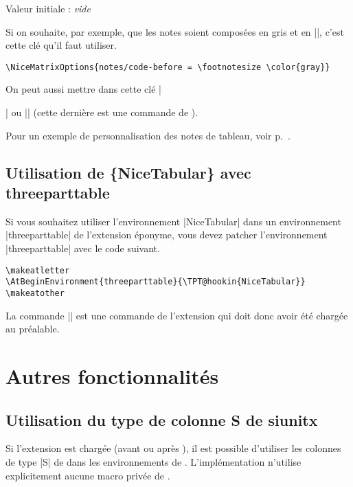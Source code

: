 \documentclass[dvipsnames]{article}%
\begin{document}
\begin{itemize}[itemsep=\medskipamount]
Valeur initiale : \textsl{vide}

Si on souhaite, par exemple, que les notes soient composées en gris et en
|\footnotesize|, c'est cette clé qu'il faut utiliser.
\begin{Verbatim}
\NiceMatrixOptions{notes/code-before = \footnotesize \color{gray}}
\end{Verbatim}
On peut aussi mettre dans cette clé |\raggedright| ou |\RaggedRight| (cette
dernière est une commande de ).
\end{itemize}



\bigskip
Pour un exemple de personnalisation des notes de tableau, voir p.~\pageref{ex:notes}.


\subsection{Utilisation de \{NiceTabular\} avec threeparttable}


Si vous souhaitez utiliser l'environnement |{NiceTabular}| dans un environnement
|{threeparttable}| de l'extension éponyme, vous devez patcher l'environnement
|{threeparttable}| avec le code suivant.
\begin{Verbatim}[commandchars=\~\#\!]
\makeatletter
\AtBeginEnvironment{threeparttable}{\TPT@hookin{NiceTabular}}
\makeatother
\end{Verbatim}

La commande |\AtBeginEnvironment| est une commande de l'extension 
qui doit donc avoir été chargée au préalable.


\section{Autres fonctionnalités}

\subsection{Utilisation du type de colonne S de siunitx}

Si l'extension  est chargée (avant ou après ), il est possible d'utiliser les colonnes
de type |S| de  dans les environnements de . L'implémentation n'utilise explicitement
aucune macro privée de . 
\end{document}
